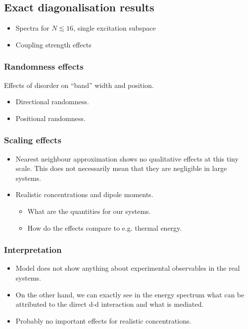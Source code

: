 \documentclass[pra,superscriptaddress,twocolumn,notitlepage,showpacs]{revtex4-1}
\begin{document}
\subsection*{Exact diagonalisation results}
\begin{itemize}
\item Spectra for $N\lesssim16$, single excitation subspace
\item Coupling strength effects
\end{itemize}

\subsubsection*{Randomness effects}

Effects of disorder on ``band'' width and position.
\begin{itemize}
\item Directional randomness.
\item Positional randomness.
\end{itemize}

\subsubsection*{Scaling effects}
\begin{itemize}
\item Nearest neighbour approximation shows no qualitative effects at this
tiny scale. This does not necessarily mean that they are negligible
in large systems.
\item Realistic concentrations and dipole moments.

\begin{itemize}
\item What are the quantities for our systems.
\item How do the effects compare to e.g. thermal energy.
\end{itemize}
\end{itemize}

\subsubsection*{Interpretation}
\begin{itemize}
\item Model does not show anything about experimental observables in the
real systems.
\item On the other hand, we can exactly see in the energy spectrum what
can be attributed to the direct d-d interaction and what is mediated.
\item Probably no important effects for realistic concentrations.
\end{itemize}
\end{document}
